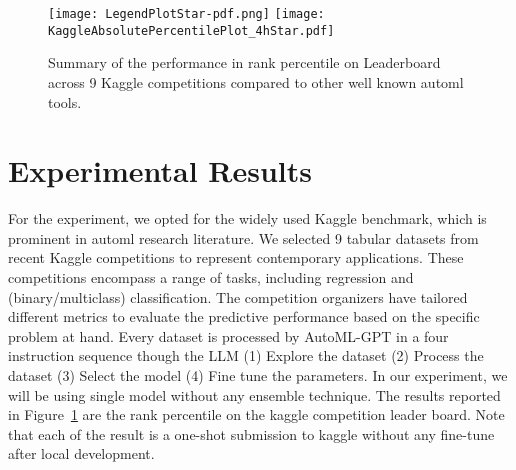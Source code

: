 \documentclass{article}
\theoremstyle{plain}
\theoremstyle{definition}
\theoremstyle{remark}
\begin{document}



\begin{figure}[t!]
  \centering
  \texttt{[image: LegendPlotStar-pdf.png]}
  \texttt{[image: KaggleAbsolutePercentilePlot\_4hStar.pdf]}
  \vspace{-20pt}
  \caption{Summary of the performance in rank percentile on Leaderboard across 9 Kaggle competitions compared to other well known automl tools.}
  \label{fig:kaggle}
  \vspace{-10pt}
\end{figure}

\vspace{-10pt}
\section{Experimental Results}
For the experiment, we opted for the widely used Kaggle benchmark, which is prominent in automl research literature. We selected 9 tabular datasets from recent Kaggle competitions to represent contemporary applications. These competitions encompass a range of tasks, including regression and (binary/multiclass) classification. The competition organizers have tailored different metrics to evaluate the predictive performance based on the specific problem at hand.
Every dataset is processed by AutoML-GPT in a four instruction sequence though the LLM (1) Explore the dataset (2) Process the dataset (3) Select the model (4) Fine tune the parameters. In our experiment, we will be using single model without any ensemble technique. The results reported in Figure~\ref{fig:kaggle} are the rank percentile on the kaggle competition leader board. Note that each of the result is a one-shot submission to kaggle without any fine-tune after local development.



\end{document}
